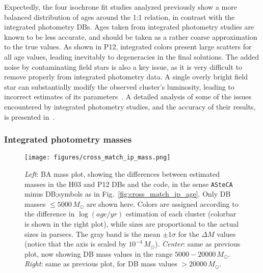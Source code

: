 \documentclass[referee]{aa}
\begin{document}
Expectedly, the four isochrone fit studies analyzed previously show a more
balanced distribution of ages around the 1:1 relation, in contrast with the
integrated photometry DBs. Ages taken from integrated photometry studies are
known to be less accurate, and should be taken as a rather coarse approximation
to the true values.
%
As shown in P12, integrated colors present large scatters for all age values,
leading inevitably to degeneracies in the final solutions.
The added noise by contaminating field stars is also a key issue, as it is
very difficult to remove properly from integrated photometry data. A
single overly bright field star can substantially modify the observed
cluster's luminosity, leading to incorrect estimates of its
parameters~\citep{Baumgardt_2013,Piatti_2014_B88}.
A detailed analysis of some of the issues encountered by integrated photometry
studies, and the accuracy of their results, is presented in~\cite{Anders_2013}.



\subsubsection{Integrated photometry masses}
\label{sssec:integ_photom_masses}
%
%
%
%

\begin{figure*}
\texttt{[image: figures/cross\_match\_ip\_mass.png]}
\caption{\emph{Left}: BA mass plot, showing the differences between estimated
masses in the H03 and P12 DBs and the code, in the sense \texttt{ASteCA} minus
DB;\@ symbols as in Fig.~\ref{fig:cross_match_ip_age}.
Only DB masses ${\le}5000\,M_{\odot}$ are shown here.
Colors are assigned according to the difference in $\log(age/yr)$ estimation of
each cluster (colorbar is shown in the right plot), while sizes are proportional to
the actual sizes in parsecs. The gray band is the mean $\pm 1\sigma$ for the
$\Delta M$ values (notice that the axis is scaled by $10^{-4}\,M_{\odot}$).
\emph{Center}: same as previous plot, now showing DB mass values in the range
$5000-20000\,M_{\odot}$.
\emph{Right}: same as previous plot, for DB mass values ${>}20000\,M_{\odot}$.
}
\label{fig:cross_match_ip_mass}
\end{figure*}
\end{document}
